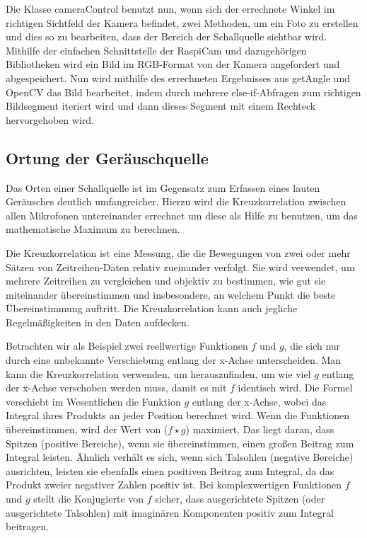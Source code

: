 Die Klasse cameraControl benutzt nun, wenn sich der errechnete Winkel im richtigen Sichtfeld der Kamera befindet, zwei Methoden, um ein Foto zu erstellen und dies so zu bearbeiten, dass der Bereich der Schallquelle sichtbar wird. Mithilfe der einfachen Schnittstelle der RaspiCam und dazugehörigen Bibliotheken wird ein Bild im RGB-Format von der Kamera angefordert und abgespeichert. Nun wird mithilfe des errechneten Ergebnisses aus getAngle und OpenCV das Bild bearbeitet, indem durch mehrere else-if-Abfragen zum richtigen Bildsegment iteriert wird und dann dieses Segment mit einem Rechteck hervorgehoben wird.


\subsection{Ortung der Geräuschquelle}

Das Orten einer Schallquelle ist im Gegensatz zum Erfassen eines lauten Geräusches deutlich umfangreicher. Hierzu wird die Kreuzkorrelation zwischen allen Mikrofonen untereinander errechnet um diese als Hilfe zu benutzen, um das mathematische Maximum zu berechnen.

Die Kreuzkorrelation ist eine Messung, die die Bewegungen von zwei oder mehr Sätzen von Zeitreihen-Daten relativ zueinander verfolgt. Sie wird verwendet, um mehrere Zeitreihen zu vergleichen und objektiv zu bestimmen, wie gut sie miteinander übereinstimmen und insbesondere, an welchem Punkt die beste Übereinstimmung auftritt. Die Kreuzkorrelation kann auch jegliche Regelmäßigkeiten in den Daten aufdecken.

Betrachten wir als Beispiel zwei reellwertige Funktionen $ f $ und $ g $, die sich nur durch eine unbekannte Verschiebung entlang der x-Achse unterscheiden. Man kann die Kreuzkorrelation verwenden, um herauszufinden, um wie viel $ g $ entlang der x-Achse verschoben werden muss, damit es mit $ f $ identisch wird. Die Formel verschiebt im Wesentlichen die Funktion $ g $ entlang der x-Achse, wobei das Integral ihres Produkts an jeder Position berechnet wird. Wenn die Funktionen übereinstimmen, wird der Wert von ($ f \star g $) maximiert. Das liegt daran, dass Spitzen (positive Bereiche), wenn sie übereinstimmen, einen großen Beitrag zum Integral leisten. Ähnlich verhält es sich, wenn sich Talsohlen (negative Bereiche) ausrichten, leisten sie ebenfalls einen positiven Beitrag zum Integral, da das Produkt zweier negativer Zahlen positiv ist. Bei komplexwertigen Funktionen $ f $ und $ g $ stellt die Konjugierte von $ f $ sicher, dass ausgerichtete Spitzen (oder ausgerichtete Talsohlen) mit imaginären Komponenten positiv zum Integral beitragen.

